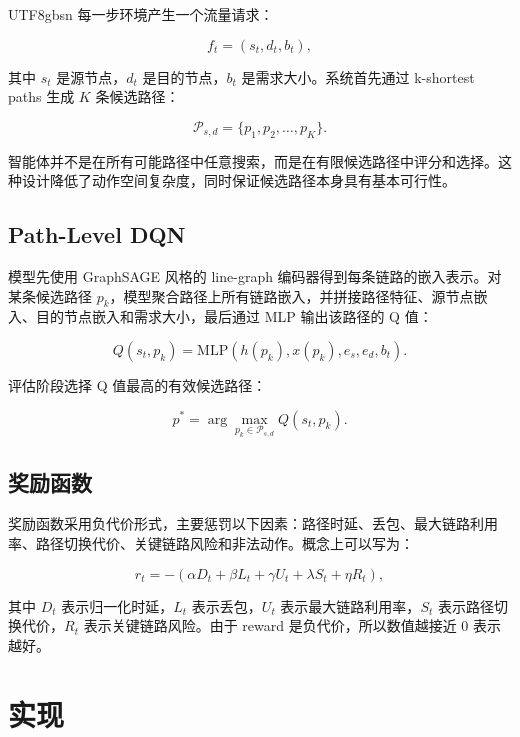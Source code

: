 \documentclass[9pt,a4paper,twocolumn,twoside]{rho-class/rho}
\begin{document}
\begin{CJK*}{UTF8}{gbsn}
每一步环境产生一个流量请求：

\begin{equation}
f_t=(s_t,d_t,b_t),
\end{equation}

其中 $s_t$ 是源节点，$d_t$ 是目的节点，$b_t$ 是需求大小。系统首先通过 k-shortest paths 生成 $K$ 条候选路径：

\begin{equation}
\mathcal{P}_{s,d}=\{p_1,p_2,\ldots,p_K\}.
\end{equation}

智能体并不是在所有可能路径中任意搜索，而是在有限候选路径中评分和选择。这种设计降低了动作空间复杂度，同时保证候选路径本身具有基本可行性。

\subsection{Path-Level DQN}

模型先使用 GraphSAGE 风格的 line-graph 编码器得到每条链路的嵌入表示。对某条候选路径 $p_k$，模型聚合路径上所有链路嵌入，并拼接路径特征、源节点嵌入、目的节点嵌入和需求大小，最后通过 MLP 输出该路径的 Q 值：

\begin{equation}
Q(s_t,p_k)=\mathrm{MLP}\left(h(p_k),x(p_k),e_s,e_d,b_t\right).
\end{equation}

评估阶段选择 Q 值最高的有效候选路径：

\begin{equation}
p^*=\arg\max_{p_k \in \mathcal{P}_{s,d}} Q(s_t,p_k).
\end{equation}

\subsection{奖励函数}

奖励函数采用负代价形式，主要惩罚以下因素：路径时延、丢包、最大链路利用率、路径切换代价、关键链路风险和非法动作。概念上可以写为：

\begin{equation}
r_t=-\left(
\alpha D_t+\beta L_t+\gamma U_t+\lambda S_t+\eta R_t
\right),
\end{equation}

其中 $D_t$ 表示归一化时延，$L_t$ 表示丢包，$U_t$ 表示最大链路利用率，$S_t$ 表示路径切换代价，$R_t$ 表示关键链路风险。由于 reward 是负代价，所以数值越接近 0 表示越好。

\section{实现}


\end{CJK*}
\end{document}
